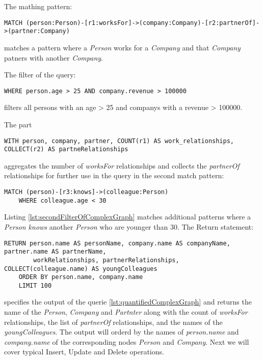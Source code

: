 The mathing pattern:
\begin{lstlisting}[caption={Matching pattern of complex quantified graph query}, label={lst:matchOfComplexGraph}]
    MATCH (person:Person)-[r1:worksFor]->(company:Company)-[r2:partnerOf]->(partner:Company)
\end{lstlisting}
matches a pattern where a \textit{Person} works for a \textit{Company} and that 
\textit{Company} patners with another \textit{Company}.

The filter of the query:
\begin{lstlisting}[caption={Filter of complex quantified graph query}, label={lst:filterOfComplexGraph}]
	WHERE person.age > 25 AND company.revenue > 100000
\end{lstlisting}
filters all persons with an age > 25 and companys with a revenue > 100000.

The part
\begin{lstlisting}[caption={Aggregations and collections of complex quantified graph query}, label={lst:filterOfComplexGraph}]
	WITH person, company, partner, COUNT(r1) AS work_relationships, COLLECT(r2) AS partneRelationships
\end{lstlisting}
aggregates the number of \textit{worksFor} relationships and collects the 
\textit{partnerOf} relationships for further use in the query in the second match pattern:
\begin{lstlisting}[caption={Further matching of complex quantified graph query}, label={lst:secondFilterOfComplexGraph}]
	MATCH (person)-[r3:knows]->(colleague:Person)
	WHERE colleague.age < 30
\end{lstlisting}
Listing \ref{lst:secondFilterOfComplexGraph} matches additional patterns where a
\textit{Person knows} another \textit{Person} who are younger than 30.\clearpage
The Return statement:
\begin{lstlisting}[caption={Return statement of complex quantified graph query}, label={lst:returnOfComplexGraph}]
	RETURN person.name AS personName, company.name AS companyName, partner.name AS partnerName, 
		workRelationships, partnerRelationships, COLLECT(colleague.name) AS youngColleagues
	ORDER BY person.name, company.name
	LIMIT 100
\end{lstlisting}
specifies the output of the querie \ref{lst:quantifiedComplexGraph} and returns 
the name of the \textit{Person}, \textit{Company} and \textit{Partnter} along 
with the count of \textit{worksFor} relationships, the list of \textit{partnerOf} relationships,
and the names of the \textit{youngColleagues}. \newline
The output will orderd by the names of \textit{person.name} and \textit{company.name}
of the corresponding nodes \textit{Person} and \textit{Company}.
Next we will cover typical Insert, Update and Delete operations.

